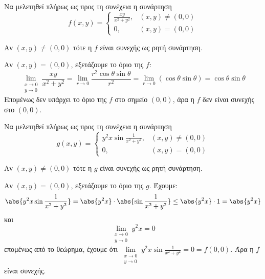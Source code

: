 \begin{example}
  Να μελετηθεί πλήρως ως προς τη συνέχεια η συνάρτηση 
  \[
    f(x,y) = 
    \begin{cases} 
      \frac{xy}{x^{2}+y^{2}}, & (x,y) \neq (0,0) \\ 
      0, & (x,y) = (0,0) 
    \end{cases}  
  \]
  \begin{solution}
  \item {}              
    Αν $ (x,y) \neq (0,0) $ τότε η $f$ είναι συνεχής 
    ως ρητή συνάρτηση.

    Αν $ (x,y)=(0,0) $, εξετάζουμε το όριο της $f$: 
    \[
      \lim\limits_{\substack{x\to 0 \\y \to 0}} \frac{xy}{x^{2}+y^{2}} = 
      \lim_{r \to 0} \frac{r^{2} \cos{\theta} \sin{\theta} }{ r^{2}} = 
      \lim_{r \to 0}(\cos{\theta} \sin{\theta}) = \cos{\theta} \sin{\theta} 
    \] 
    Επομένως δεν υπάρχει το όριο της $f$ στο σημείο $ (0,0) $, άρα η $f$ 
    δεν είναι συνεχής στο $ (0,0) $.
  \end{solution}
\end{example}

\begin{example}
  Να μελετηθεί πλήρως ως προς τη συνέχεια η συνάρτηση 
  \[
    g(x,y) = 
    \begin{cases} 
      y^{2}x \sin{\frac{1}{x^{2}+y^{2}}}, & (x,y) 
      \neq (0,0) \\ 0, & (x,y) = (0,0)
    \end{cases}  
  \] 
  \begin{solution}
  \item {}
    Αν $ (x,y) \neq (0,0) $ τότε η $g$ είναι συνεχής 
    ως ρητή συνάρτηση.

    Αν $ (x,y)=(0,0) $, εξετάζουμε το όριο της $g$. 
    Έχουμε:
    \[
      \abs{y^{2}x \sin{\frac{1}{x^{2}+y^{2}}}} = 
      \abs{y^{2}x}\cdot \abs{\sin{\frac{1}{x^{2}+y^{2}}}}
      \leq \abs{y^{2}x} \cdot 1 = \abs{y^{2}x}  
    \] 
    και 
    \[
      \lim\limits_{\substack{x\to 0 \\y \to 0}} y^{2}x = 0 
    \] 
    επομένως από το θεώρημα, έχουμε ότι 
    $ \lim\limits_{\substack{x\to 0 \\y \to 0}} y^{2}x 
    \sin{\frac{1}{x^{2}+y^{2}}} = 0 = f(0,0) $. Άρα η $f$ είναι συνεχής.
  \end{solution}
\end{example}

